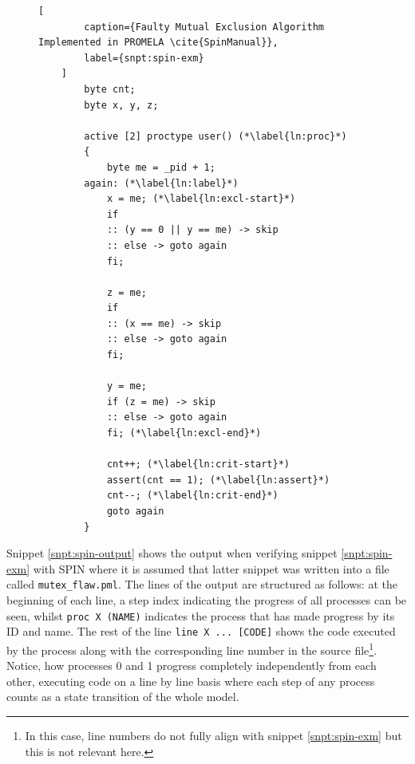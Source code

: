 \begin{figure}
    \begin{lstlisting}[
        caption={Faulty Mutual Exclusion Algorithm Implemented in PROMELA \cite{SpinManual}},
        label={snpt:spin-exm}
    ]
        byte cnt;
        byte x, y, z;

        active [2] proctype user() (*\label{ln:proc}*)
        {
            byte me = _pid + 1;
        again: (*\label{ln:label}*)
            x = me; (*\label{ln:excl-start}*)
            if
            :: (y == 0 || y == me) -> skip
            :: else -> goto again
            fi;

            z = me;
            if
            :: (x == me) -> skip
            :: else -> goto again
            fi;

            y = me;
            if (z = me) -> skip
            :: else -> goto again
            fi; (*\label{ln:excl-end}*)

            cnt++; (*\label{ln:crit-start}*)
            assert(cnt == 1); (*\label{ln:assert}*)
            cnt--; (*\label{ln:crit-end}*)
            goto again
        }
    \end{lstlisting}
\end{figure}

Snippet \ref{snpt:spin-output} shows the output when verifying snippet \ref{snpt:spin-exm} with SPIN where it is assumed that latter snippet was written into a file called \lstinline{mutex_flaw.pml}.
The lines of the output are structured as follows: at the beginning of each line, a step index indicating the progress of all processes can be seen, whilst \lstinline{proc X (NAME)} indicates the process that has made progress by its ID and name.
The rest of the line \lstinline{line X ... [CODE]} shows the code executed by the process along with the corresponding line number in the source file\footnote{%
    In this case, line numbers do not fully align with snippet \ref{snpt:spin-exm} but this is not relevant here.
}.
Notice, how processes 0 and 1 progress completely independently from each other, executing code on a line by line basis where each step of any process counts as a state transition of the whole model.


